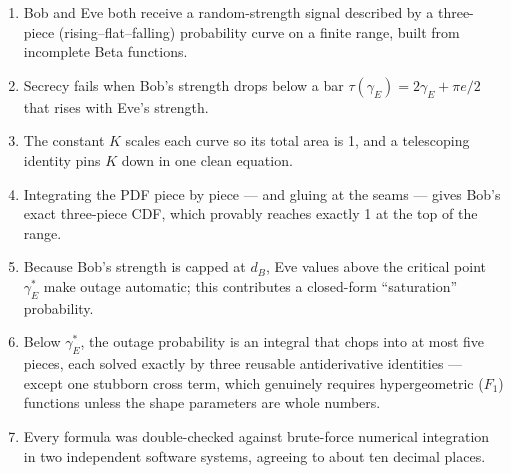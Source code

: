 \documentclass[11pt]{article}
\begin{document}
\begin{tcolorbox}[colback=softgray, colframe=black!40, title=\textbf{The whole document in seven sentences}]
\begin{enumerate}
\item Bob and Eve both receive a random-strength signal described by a three-piece
      (rising--flat--falling) probability curve on a finite range, built from
      incomplete Beta functions.
\item Secrecy fails when Bob's strength drops below a bar
      $\tau(\gamma_E)=2\gamma_E+\pi e/2$ that rises with Eve's strength.
\item The constant $K$ scales each curve so its total area is 1, and a telescoping
      identity pins $K$ down in one clean equation.
\item Integrating the PDF piece by piece --- and gluing at the seams --- gives Bob's
      exact three-piece CDF, which provably reaches exactly 1 at the top of the range.
\item Because Bob's strength is capped at $d_B$, Eve values above the critical point
      $\gamma_E^{*}$ make outage automatic; this contributes a closed-form
      ``saturation'' probability.
\item Below $\gamma_E^{*}$, the outage probability is an integral that chops into at
      most five pieces, each solved exactly by three reusable antiderivative
      identities --- except one stubborn cross term, which genuinely requires
      hypergeometric ($F_1$) functions unless the shape parameters are whole numbers.
\item Every formula was double-checked against brute-force numerical integration in
      two independent software systems, agreeing to about ten decimal places.
\end{enumerate}
\end{tcolorbox}
\end{document}
